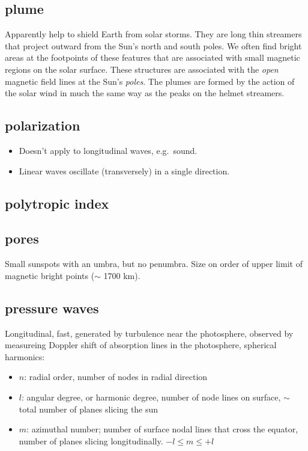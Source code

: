 \documentclass{article}
\begin{document}
\subsection{plume}
Apparently help to shield Earth from solar storms.
They are long thin streamers that project outward from the Sun's north and
south poles. We often find bright areas at the footpoints of these
features that are associated with small magnetic regions on the solar
surface. These structures are associated with the \emph{open} magnetic
field lines at the Sun's \emph{poles}. The plumes are formed by the action of
the solar wind in much the same way as the peaks on the helmet
streamers.
\subsection{polarization}
\begin{itemize}
    \item Doesn't apply to longitudinal waves, e.g.\ sound.
    \item Linear waves oscillate (transversely) in a single direction.
\end{itemize}

\subsection{polytropic index}
\subsection{pores}
Small sunspots with an umbra, but no penumbra.
Size on order of upper limit of magnetic bright points ($\sim$ 1700
km).
\subsection{pressure waves}
Longitudinal, fast, generated by turbulence near the photosphere,
observed by measureing Doppler shift of absorption lines in the
photosphere, spherical harmonics:
\begin{itemize}
    \item $n$: radial order, number of nodes in radial direction
    \item $l$: angular degree, or harmonic degree,
        number of node lines on surface,
        $\sim$ total number of planes slicing the sun
    \item $m$: azimuthal number;
        number of surface nodal lines that cross the equator,
        number of planes slicing longitudinally. $-l\leq m\leq +l$
\end{itemize}
\end{document}
